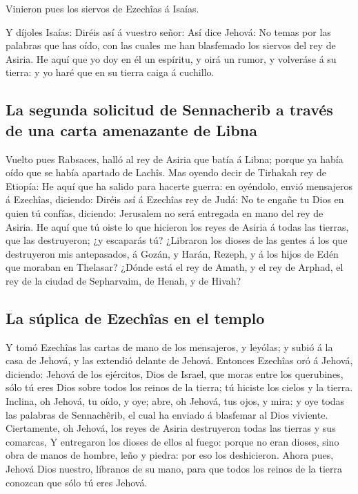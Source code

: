  Vinieron pues los siervos de Ezechîas á Isaías.

 Y díjoles Isaías: Diréis así á vuestro señor: Así dice
Jehová: No temas por las palabras que has oído, con las cuales me han
blasfemado los siervos del rey de Asiria.  He aquí que yo
doy en él un espíritu, y oirá un rumor, y volveráse á su tierra: y yo
haré que en su tierra caiga á cuchillo.

\hypertarget{la-segunda-solicitud-de-sennacherib-a-travuxe9s-de-una-carta-amenazante-de-libna}{%
\subsection{La segunda solicitud de Sennacherib a través de una carta
amenazante de
Libna}\label{la-segunda-solicitud-de-sennacherib-a-travuxe9s-de-una-carta-amenazante-de-libna}}

 Vuelto pues Rabsaces, halló al rey de Asiria que batía á
Libna; porque ya había oído que se había apartado de Lachîs.
 Mas oyendo decir de Tirhakah rey de Etiopía: He aquí que
ha salido para hacerte guerra: en oyéndolo, envió mensajeros á Ezechîas,
diciendo:  Diréis así á Ezechîas rey de Judá: No te
engañe tu Dios en quien tú confías, diciendo: Jerusalem no será
entregada en mano del rey de Asiria.  He aquí que tú
oiste lo que hicieron los reyes de Asiria á todas las tierras, que las
destruyeron; ¿y escaparás tú?  ¿Libraron los dioses de
las gentes á los que destruyeron mis antepasados, á Gozán, y Harán,
Rezeph, y á los hijos de Edén que moraban en Thelasar? 
¿Dónde está el rey de Amath, y el rey de Arphad, el rey de la ciudad de
Sepharvaim, de Henah, y de Hivah?

\hypertarget{la-suxfaplica-de-ezechuxeeas-en-el-templo}{%
\subsection{La súplica de Ezechîas en el
templo}\label{la-suxfaplica-de-ezechuxeeas-en-el-templo}}

 Y tomó Ezechîas las cartas de mano de los mensajeros, y
leyólas; y subió á la casa de Jehová, y las extendió delante de Jehová.
 Entonces Ezechîas oró á Jehová, diciendo:
 Jehová de los ejércitos, Dios de Israel, que moras entre
los querubines, sólo tú eres Dios sobre todos los reinos de la tierra;
tú hiciste los cielos y la tierra.  Inclina, oh Jehová,
tu oído, y oye; abre, oh Jehová, tus ojos, y mira: y oye todas las
palabras de Sennachêrib, el cual ha enviado á blasfemar al Dios
viviente.  Ciertamente, oh Jehová, los reyes de Asiria
destruyeron todas las tierras y sus comarcas,  Y
entregaron los dioses de ellos al fuego: porque no eran dioses, sino
obra de manos de hombre, leño y piedra: por eso los deshicieron.
 Ahora pues, Jehová Dios nuestro, líbranos de su mano,
para que todos los reinos de la tierra conozcan que sólo tú eres Jehová.

